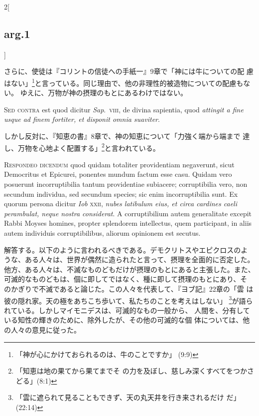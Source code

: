 \documentclass[paper=a4paper,fontsize=10pt,jafontsize=9pt,titlepage]{jlreq}
\begin{document}
\begin{paracol}{2}[\subsection{arg.1}]
\switchcolumn

さらに、使徒は『コリントの信徒への手紙一』9章で「神には牛についての配
慮はない」\footnote{「神が心にかけておられるのは、牛のことですか」
(9:9)}と言っている。同じ理由で、他の非理性的被造物についての配慮もない。
ゆえに、万物が神の摂理のもとにあるわけではない。

\switchcolumn*[\subsection{s.c.}]

{\scshape Sed contra} est quod dicitur {\itshape Sap}.~{\scshape viii}, de
divina sapientia, quod {\itshape attingit a fine usque ad finem fortiter, et
disponit omnia suaviter}.

\switchcolumn

しかし反対に、『知恵の書』8章で、神の知恵について「力強く端から端まで
達し、万物を心地よく配置する」\footnote{「知恵は地の果てから果てまでそ
の力を及ぼし、慈しみ深くすべてをつかさどる」(8:1)}と言われている。


{\scshape Respondeo dicendum} quod quidam totaliter
providentiam negaverunt, sicut Democritus et Epicurei, ponentes mundum
factum esse casu. Quidam vero posuerunt incorruptibilia tantum
providentiae subiacere; corruptibilia vero, non secundum individua, sed
secundum species; sic enim incorruptibilia sunt. Ex quorum persona
dicitur {\itshape Iob} {\scshape xxii}, {\itshape nubes latibulum eius, et circa cardines caeli
perambulat, neque nostra considerat}. A corruptibilium autem generalitate
excepit Rabbi Moyses homines, propter splendorem intellectus, quem
participant, in aliis autem individuis corruptibilibus, aliorum
opinionem est secutus.

\switchcolumn

解答する。以下のように言われるべきである。デモクリトスやエピクロスのよ
うな、ある人々は、世界が偶然に造られたと言って、摂理を全面的に否定した。
他方、ある人々は、不滅なものどもだけが摂理のもとにあると主張した。また、
可滅的なものどもは、個に即してではなく、種に即して摂理のもとにあり、そ
のかぎりで不滅であると論じた。この人々を代表して、『ヨブ記』22章の「雲
は彼の隠れ家。天の極をあちこち歩いて、私たちのことを考えはしない」
\footnote{「雲に遮られて見ることもできず、天の丸天井を行き来されるだけ
だ」(22:14)}が語られている。しかしマイモニデスは、可滅的なもの一般から、
人間を、分有している知性の輝きのために、除外したが、その他の可滅的な個
体については、他の人々の意見に従った。


\end{paracol}
\end{document}
